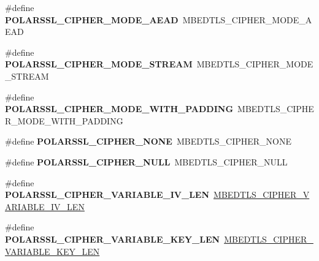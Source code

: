 \begin{DoxyCompactItemize}
\mbox{\label{compat-1_83_8h_a98537bee3c712431f7dce5c154e89164}} 
\#define {\bfseries P\+O\+L\+A\+R\+S\+S\+L\+\_\+\+C\+I\+P\+H\+E\+R\+\_\+\+M\+O\+D\+E\+\_\+\+A\+E\+AD}~M\+B\+E\+D\+T\+L\+S\+\_\+\+C\+I\+P\+H\+E\+R\+\_\+\+M\+O\+D\+E\+\_\+\+A\+E\+AD
\item 
\mbox{\label{compat-1_83_8h_aa7128958579e730a801d0c92340685ea}} 
\#define {\bfseries P\+O\+L\+A\+R\+S\+S\+L\+\_\+\+C\+I\+P\+H\+E\+R\+\_\+\+M\+O\+D\+E\+\_\+\+S\+T\+R\+E\+AM}~M\+B\+E\+D\+T\+L\+S\+\_\+\+C\+I\+P\+H\+E\+R\+\_\+\+M\+O\+D\+E\+\_\+\+S\+T\+R\+E\+AM
\item 
\mbox{\label{compat-1_83_8h_a5347e7fd4e1fbf8968317a34dd67bb9d}} 
\#define {\bfseries P\+O\+L\+A\+R\+S\+S\+L\+\_\+\+C\+I\+P\+H\+E\+R\+\_\+\+M\+O\+D\+E\+\_\+\+W\+I\+T\+H\+\_\+\+P\+A\+D\+D\+I\+NG}~M\+B\+E\+D\+T\+L\+S\+\_\+\+C\+I\+P\+H\+E\+R\+\_\+\+M\+O\+D\+E\+\_\+\+W\+I\+T\+H\+\_\+\+P\+A\+D\+D\+I\+NG
\item 
\mbox{\label{compat-1_83_8h_ad9096f5e136f037f6ea389a1214cae28}} 
\#define {\bfseries P\+O\+L\+A\+R\+S\+S\+L\+\_\+\+C\+I\+P\+H\+E\+R\+\_\+\+N\+O\+NE}~M\+B\+E\+D\+T\+L\+S\+\_\+\+C\+I\+P\+H\+E\+R\+\_\+\+N\+O\+NE
\item 
\mbox{\label{compat-1_83_8h_a3cfa3bb163d09c2ee18fe1ff7c7f3708}} 
\#define {\bfseries P\+O\+L\+A\+R\+S\+S\+L\+\_\+\+C\+I\+P\+H\+E\+R\+\_\+\+N\+U\+LL}~M\+B\+E\+D\+T\+L\+S\+\_\+\+C\+I\+P\+H\+E\+R\+\_\+\+N\+U\+LL
\item 
\mbox{\label{compat-1_83_8h_af1930bcb6327197ff0980aed8bfc3736}} 
\#define {\bfseries P\+O\+L\+A\+R\+S\+S\+L\+\_\+\+C\+I\+P\+H\+E\+R\+\_\+\+V\+A\+R\+I\+A\+B\+L\+E\+\_\+\+I\+V\+\_\+\+L\+EN}~\mbox{\hyperlink{cipher_8h_a2a6dc5188d4a1e9bc43d9ea7c8505c6c}{M\+B\+E\+D\+T\+L\+S\+\_\+\+C\+I\+P\+H\+E\+R\+\_\+\+V\+A\+R\+I\+A\+B\+L\+E\+\_\+\+I\+V\+\_\+\+L\+EN}}
\item 
\mbox{\label{compat-1_83_8h_a49772688b048b1048944402c3429bf41}} 
\#define {\bfseries P\+O\+L\+A\+R\+S\+S\+L\+\_\+\+C\+I\+P\+H\+E\+R\+\_\+\+V\+A\+R\+I\+A\+B\+L\+E\+\_\+\+K\+E\+Y\+\_\+\+L\+EN}~\mbox{\hyperlink{cipher_8h_a882893bcfc917982037621f6e97968a6}{M\+B\+E\+D\+T\+L\+S\+\_\+\+C\+I\+P\+H\+E\+R\+\_\+\+V\+A\+R\+I\+A\+B\+L\+E\+\_\+\+K\+E\+Y\+\_\+\+L\+EN}}

\end{DoxyCompactItemize}
